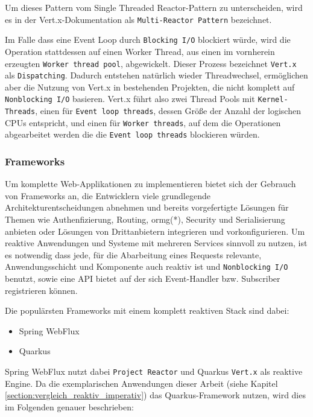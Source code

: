 Um dieses Pattern vom Single Threaded Reactor-Pattern zu unterscheiden, wird es in der Vert.x-Dokumentation als \verb|Multi-Reactor Pattern| bezeichnet.
\parencite{Vert.xDocs}  \newline

Im Falle dass eine Event Loop durch \verb|Blocking I/O| blockiert würde, wird die Operation stattdessen auf einen
Worker Thread, aus einen im vornherein erzeugten \verb|Worker thread pool|, abgewickelt. Dieser Prozess bezeichnet \verb|Vert.x| als \verb|Dispatching|.
Dadurch entstehen natürlich wieder Threadwechsel, ermöglichen aber die Nutzung von Vert.x in bestehenden Projekten, die nicht komplett
auf \verb|Nonblocking I/O| basieren\parencite[Seite 2]{VertxArticle}.
Vert.x führt also zwei Thread Pools mit \verb|Kernel-Threads|, einen für \verb|Event loop threads|, dessen Größe der Anzahl der logischen CPUs entspricht,
und einen für \verb|Worker threads|, auf dem die Operationen abgearbeitet werden die die \verb|Event loop threads| blockieren würden.
\parencite{Vert.xOptions}

\subsubsection{Frameworks}
\label{subsubsec:frameworks}
Um komplette Web-Applikationen zu implementieren bietet sich der Gebrauch von Frameworks an, die Entwicklern viele grundlegende Architekturentscheidungen
abnehmen und bereits vorgefertigte Lösungen für Themen wie Authenfizierung, Routing, \Gls{ormg}(*), Security und Serialisierung anbieten oder
Lösungen von Drittanbietern integrieren und vorkonfigurieren.
Um reaktive Anwendungen und Systeme mit mehreren Services sinnvoll zu nutzen, ist es notwendig dass jede, für die Abarbeitung eines Requests relevante,
Anwendungsschicht und Komponente auch reaktiv ist und \verb|Nonblocking I/O| benutzt, sowie eine API bietet auf der
sich Event-Handler bzw. Subscriber registrieren können.

Die populärsten Frameworks mit einem komplett reaktiven Stack sind dabei:

\begin{itemize}
	\item Spring WebFlux
	\item Quarkus
\end{itemize}

Spring WebFlux nutzt dabei \verb|Project Reactor| und Quarkus \verb|Vert.x| als reaktive Engine. \parencite{QuarkusReactiveGettingStarted}
Da die exemplarischen Anwendungen dieser Arbeit (siehe Kapitel \ref{section:vergleich_reaktiv_imperativ}) das Quarkus-Framework nutzen, wird dies
im Folgenden genauer beschrieben:
